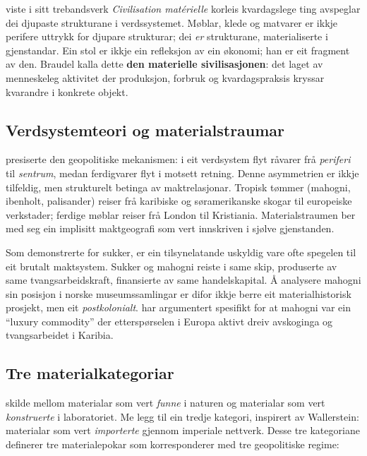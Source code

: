 \documentclass[10pt, a4paper, twocolumn]{article}
\begin{document}
\citet{braudel1979} viste i sitt trebandsverk \emph{Civilisation mat\'erielle} korleis kvardagslege ting avspeglar dei djupaste strukturane i verdssystemet. Møblar, klede og matvarer er ikkje perifere uttrykk for djupare strukturar; dei \emph{er} strukturane, materialiserte i gjenstandar. Ein stol er ikkje ein refleksjon av ein økonomi; han er eit fragment av den. Braudel kalla dette \textbf{den materielle sivilisasjonen}: det laget av menneskeleg aktivitet der produksjon, forbruk og kvardagspraksis kryssar kvarandre i konkrete objekt.

\subsection{Verdsystemteori og materialstraumar}

\citet{wallerstein2004} presiserte den geopolitiske mekanismen: i eit verdsystem flyt råvarer frå \emph{periferi} til \emph{sentrum}, medan ferdigvarer flyt i motsett retning. Denne asymmetrien er ikkje tilfeldig, men strukturelt betinga av maktrelasjonar. Tropisk tømmer (mahogni, ibenholt, palisander) reiser frå karibiske og søramerikanske skogar til europeiske verkstader; ferdige møblar reiser frå London til Kristiania. Materialstraumen ber med seg ein implisitt maktgeografi som vert innskriven i sjølve gjenstanden.

Som \citet{mintz1985} demonstrerte for sukker, er ein tilsynelatande uskyldig vare ofte spegelen til eit brutalt maktsystem. Sukker og mahogni reiste i same skip, produserte av same tvangsarbeidskraft, finansierte av same handelskapital. Å analysere mahogni sin posisjon i norske museumssamlingar er difor ikkje berre eit materialhistorisk prosjekt, men eit \emph{postkolonialt}. \citet{anderson2012} har argumentert spesifikt for at mahogni var ein ``luxury commodity'' der etterspørselen i Europa aktivt dreiv avskoginga og tvangsarbeidet i Karibia.

\subsection{Tre materialkategoriar}

\citet{manzini1986} skilde mellom materialar som vert \emph{funne} i naturen og materialar som vert \emph{konstruerte} i laboratoriet. Me legg til ein tredje kategori, inspirert av Wallerstein: materialar som vert \emph{importerte} gjennom imperiale nettverk. Desse tre kategoriane definerer tre materialepokar som korresponderer med tre geopolitiske regime:
\end{document}
